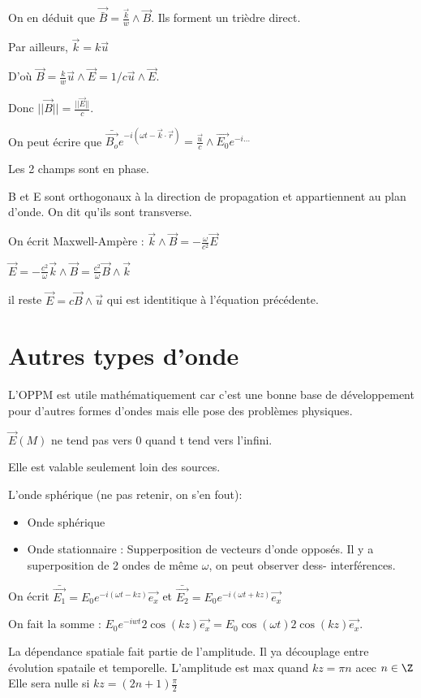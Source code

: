\documentclass[french]{yLectureNote}
\renewcommand{\vec}{\overrightarrow}
\newcommand{\norm}[1]{||\vec{#1}||}
\newcommand{\E}{\vec{E}(M)}
\begin{document}
On en déduit que $\vec{\bar{B}} = \frac{\vec{k}}{w}\wedge \vec{B}$. Ils forment un trièdre direct.

Par ailleurs, $\vec{k} = k\vec{u}$

D'où $\vec{B} = \frac{k}{w}\vec{u}\wedge \vec{E} = 1/c \vec{u}\wedge \vec{E}$.

Donc $\norm{B} = \frac{\norm{E}}{c}$.

On peut écrire que $\bar{\vec{B_o}} e^{-i(\omega t - \vec{k}\cdot \vec{r})} = \frac{\vec{u}}{c}\wedge \vec{E_0} e^{-i \dots}$

Les 2 champs sont en phase.

B et E sont orthogonaux à la direction de propagation et appartiennent au plan d'onde. On dit qu'ils sont transverse.

On écrit Maxwell-Ampère : $\vec{k}\wedge \vec{B} = - \frac{\omega}{c^2}\vec{E}$

$\vec{E} = - \frac{c^2}{\omega}\vec{k}\wedge \vec{B} = \frac{c^2}{\omega}\vec{B}\wedge \vec{k}$

il reste $\vec{E} = c\vec{B}\wedge \vec{u}$ qui est identitique à l'équation précédente.
 \section{Autres types d'onde}
 L'OPPM est utile mathématiquement car c'est une bonne base de développement pour d'autres formes d'ondes mais elle pose des problèmes physiques.

 $\E$ ne tend pas vers 0 quand t tend vers l'infini.

 Elle est valable seulement loin des sources.

 L'onde sphérique (ne pas retenir, on s'en fout): 

 \begin{itemize}
    \item Onde sphérique
    \item Onde stationnaire : Supperposition de vecteurs d'onde opposés. Il y a superposition de 2 ondes de m\^eme $\omega$, on peut observer dess- interférences.
 \end{itemize}
 On écrit $\bar{\vec{E_1}} = E_0 e^{-i(\omega t-kz)}\vec{e_x}$ et $\bar{\vec{E_2}} = E_0 e^{-i(\omega t+kz)}\vec{e_x}$

 On fait la somme : $E_0 e^{-iwt}2\cos(kz)\vec{e_x} = E_0 \cos(\omega t)2\cos(kz)\vec{e_x}$.

 La dépendance spatiale fait partie de l'amplitude. Il ya découplage entre évolution spataile et temporelle. L'amplitude est max quand $kz = \pi n$ acec $n\in \Z$ Elle sera nulle si $kz = (2n+1)\frac{\pi}{2}$
\end{document}
